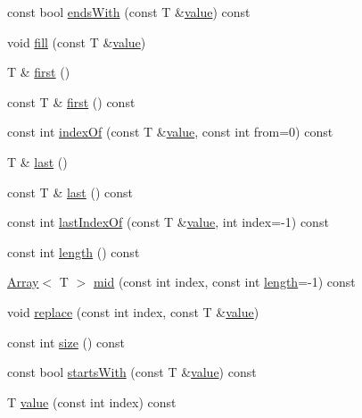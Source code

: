 \begin{DoxyCompactItemize}
\item 
const bool \hyperlink{classprism_1_1_array_a8f8ecd4d34589f7cbc28d6f14fd3de9a}{ends\+With} (const T \&\hyperlink{classprism_1_1_array_a2c5690996975510eed7112066b936d8f}{value}) const 
\item 
void \hyperlink{classprism_1_1_array_a366f1c9b89d2133171a0ed2bb54534ce}{fill} (const T \&\hyperlink{classprism_1_1_array_a2c5690996975510eed7112066b936d8f}{value})
\item 
T \& \hyperlink{classprism_1_1_array_a694e4a3fe9be1096b8ad954e2bd189d6}{first} ()
\item 
const T \& \hyperlink{classprism_1_1_array_a3d24022c7737524c96caea7435948ab8}{first} () const 
\item 
const int \hyperlink{classprism_1_1_array_aa3eca6ff8f386eed2ddfcf615e1f4bc1}{index\+Of} (const T \&\hyperlink{classprism_1_1_array_a2c5690996975510eed7112066b936d8f}{value}, const int from=0) const 
\item 
T \& \hyperlink{classprism_1_1_array_a1994d3d47017ac66c1aacb39fd34be0b}{last} ()
\item 
const T \& \hyperlink{classprism_1_1_array_a94dd2e049b9740e20281cac225d7dee3}{last} () const 
\item 
const int \hyperlink{classprism_1_1_array_a1a59ebea7df1fd8789b8895f5e77d6ff}{last\+Index\+Of} (const T \&\hyperlink{classprism_1_1_array_a2c5690996975510eed7112066b936d8f}{value}, int index=-\/1) const 
\item 
const int \hyperlink{classprism_1_1_array_a7075e469a15ddfa81059842598fa9e89}{length} () const 
\item 
\hyperlink{classprism_1_1_array}{Array}$<$ T $>$ \hyperlink{classprism_1_1_array_affc7647f404c928edf9521abdfbcf88b}{mid} (const int index, const int \hyperlink{classprism_1_1_array_a7075e469a15ddfa81059842598fa9e89}{length}=-\/1) const 
\item 
void \hyperlink{classprism_1_1_array_aa0aff831c9d2c94fd834d8abbbe94d2b}{replace} (const int index, const T \&\hyperlink{classprism_1_1_array_a2c5690996975510eed7112066b936d8f}{value})
\item 
const int \hyperlink{classprism_1_1_array_a83c88f0f351ac35798f40ed4e922e187}{size} () const 
\item 
const bool \hyperlink{classprism_1_1_array_aa80d5944d464d8de5f7b991b355e10b2}{starts\+With} (const T \&\hyperlink{classprism_1_1_array_a2c5690996975510eed7112066b936d8f}{value}) const 
\item 
T \hyperlink{classprism_1_1_array_a2c5690996975510eed7112066b936d8f}{value} (const int index) const 

\end{DoxyCompactItemize}
